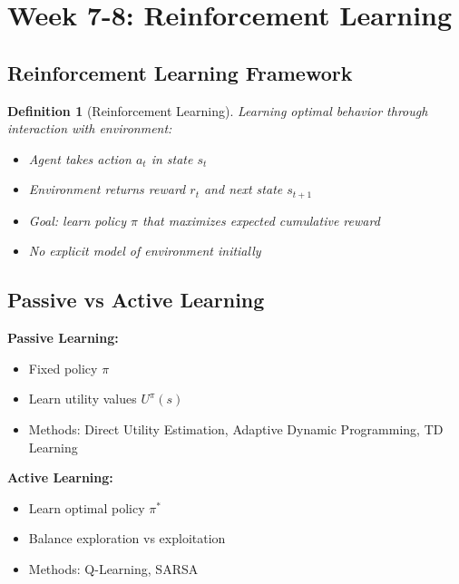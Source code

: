 \documentclass[11pt,letterpaper]{article}
\newtheorem{definition}{Definition}[section]
\begin{document}
\section{Week 7-8: Reinforcement Learning}

\subsection{Reinforcement Learning Framework}

\begin{definition}[Reinforcement Learning]
Learning optimal behavior through interaction with environment:
\begin{itemize}
    \item Agent takes action $a_t$ in state $s_t$
    \item Environment returns reward $r_t$ and next state $s_{t+1}$
    \item Goal: learn policy $\pi$ that maximizes expected cumulative reward
    \item No explicit model of environment initially
\end{itemize}
\end{definition}

\subsection{Passive vs Active Learning}

\begin{concept}
\textbf{Passive Learning:}
\begin{itemize}
    \item Fixed policy $\pi$
    \item Learn utility values $U^\pi(s)$
    \item Methods: Direct Utility Estimation, Adaptive Dynamic Programming, TD Learning
\end{itemize}

\textbf{Active Learning:}
\begin{itemize}
    \item Learn optimal policy $\pi^*$
    \item Balance exploration vs exploitation
    \item Methods: Q-Learning, SARSA
\end{itemize}
\end{concept}
\end{document}
